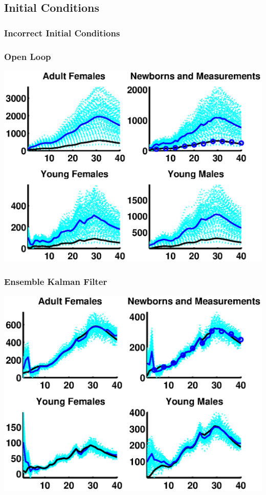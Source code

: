 \documentclass[mathserif]{beamer}
\begin{document}
\subsection{Initial Conditions}

\begin{frame}
\begin{center}
\frametitle{Incorrect Initial Conditions}
\end{center}
\end{frame}

\begin{frame}
\begin{center}
\frametitle{Open Loop}
\includegraphics[width=1\textwidth]{openloop}
\end{center}
\end{frame}

\begin{frame}
\begin{center}
\frametitle{Ensemble Kalman Filter}
\includegraphics[width=1\textwidth]{filtered}
\end{center}
\end{frame}
\end{document}
